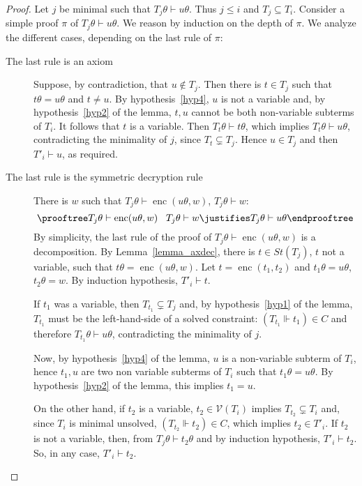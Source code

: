 \documentclass[acmtocl,acmnow]{acmtrans2m}
\newcommand{\var}{\mathcal{V}}
\newcommand{\st}{\mathit{St}}
\newcommand{\penc}[2]{\operatorname{enc}(#1,#2)}
\begin{document}
\begin{proof}
Let $j$ be minimal such that $T_j\theta\vdash u\theta$. Thus $j\le i$ and $T_j\subseteq T_i$.
Consider a simple proof $\pi$ of $T_j\theta\vdash u\theta$.
We reason by induction on the depth of $\pi$. We analyze the different
cases, depending on the last rule of $\pi$:
\begin{description}
\item[The last rule is an axiom]
Suppose, by contradiction, that $u\notin T_j$.
Then there is $t\in T_j$ such that $t\theta=u\theta$ and $t\neq u$.
By hypothesis~\ref{hyp4}, $u$ is not a variable and, by hypothesis~\ref{hyp2} of the lemma,
 $t,u$ cannot be both
non-variable subterms of $T_i$. It follows that $t$ is a variable.
Then $T_t\theta\vdash t\theta$, which implies $T_t\theta\vdash u\theta$,
contradicting the minimality of $j$, since 
$T_t\subsetneq T_j$. 
Hence $u\in T_j$ and then $T'_i\vdash u$, as required.


\item[The last rule is the symmetric decryption rule]
There is $w$ such that $T_j\theta\vdash \penc{u\theta}{w}$,
$T_j\theta\vdash w$:
\[
\prooftree
T_j\theta \vdash \penc{u\theta}{w}\;\;
\; T_j\theta\vdash w 
\justifies T_j\theta\vdash u\theta
\endprooftree
\]
By simplicity, 
the last rule of the proof of $T_j\theta\vdash
\penc{u\theta}{w}$ is a decomposition. 
By Lemma~\ref{lemma_axdec}, there is $t\in\st(T_j)$, $t$ not a variable, 
such that $t\theta=\penc{u\theta}{w}$. Let $t=\penc{t_1}{t_2}$ and $t_1\theta=u\theta$, $t_2\theta=w$.  By induction hypothesis, $T'_i \vdash t$.

If $t_1$ was a variable, then $T_{t_1}\subsetneq T_j$ and, by hypothesis~\ref{hyp1} of
the lemma,
$T_{t_1}$ must be the left-hand-side of
a solved constraint: $(T_{t_1}\Vdash t_1)\in C$ and therefore
 $T_{t_1}\theta \vdash u\theta$,
contradicting the minimality of $j$. 

Now, by hypothesis~\ref{hyp4} of the lemma, $u$ is a non-variable
subterm of $T_i$, hence  $t_1,u$ are two non variable
subterms of $T_i$ such that $t_1\theta=u\theta$. By hypothesis~\ref{hyp2} 
of the lemma,
this implies $t_1=u$. 

On the other hand, if $t_2$ is a variable, 
 $t_2\in \var(T_i)$ implies $T_{t_2}\subsetneq T_i$ and, since $T_i$ is 
minimal unsolved, $(T_{t_2}\Vdash t_2)\in C$, which
implies $t_2\in T'_i$. If $t_2$ is not a variable, then, from $T_j\theta\vdash t_2\theta$ and by induction hypothesis,
$T'_i \vdash t_2$. So, in any case, $T'_i\vdash t_2$.


\end{description}
\end{proof}
\end{document}
